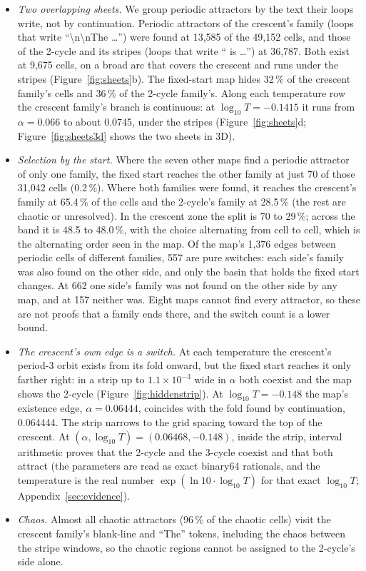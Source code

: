 \documentclass[11pt,letterpaper]{article}
\begin{document}
\begin{itemize}
  \item \emph{Two overlapping sheets.} We group periodic attractors by the text their loops write, not by
  continuation. Periodic attractors of the crescent's family (loops that write
  ``\textbackslash n\textbackslash nThe \ldots'') were found at 13{,}585 of the 49{,}152 cells, and those of the
  2-cycle and its stripes (loops that write `` is \ldots'') at 36{,}787. Both exist at 9{,}675 cells, on a broad arc that
  covers the crescent and runs under the stripes (Figure~\ref{fig:sheets}b). The fixed-start map hides 32\,\% of the
  crescent family's cells and 36\,\% of the 2-cycle family's. Along each temperature row the crescent family's
  branch is continuous: at $\log_{10}T=-0.1415$ it runs from $\alpha=0.066$ to about 0.0745, under the stripes
  (Figure~\ref{fig:sheets}d; Figure~\ref{fig:sheets3d} shows the two sheets in 3D).
  \item \emph{Selection by the start.} Where the seven other maps find a periodic attractor of only one family, the
  fixed start reaches the other family at just 70 of those 31{,}042 cells (0.2\,\%). Where both families were found,
  it reaches the crescent's family at 65.4\,\% of the cells and the 2-cycle's family at 28.5\,\% (the rest are
  chaotic or unresolved). In the crescent
  zone the split is 70 to 29\,\%; across the band it is 48.5 to 48.0\,\%, with the choice alternating from cell to
  cell, which is the alternating order seen in the map. Of the map's 1{,}376 edges between periodic cells of different
  families, 557 are pure switches: each side's family was also found on the other side, and only the basin that holds
  the fixed start changes. At 662 one side's family was not found on the other side by any map, and at 157 neither
  was. Eight maps cannot find every attractor, so these are not proofs that a family ends there, and the switch count
  is a lower bound.
  \item \emph{The crescent's own edge is a switch.} At each temperature the crescent's period-3 orbit exists from its
  fold onward, but the fixed start reaches it only farther right: in a strip up to $1.1\times10^{-3}$ wide in $\alpha$
  both coexist and the map shows the 2-cycle (Figure~\ref{fig:hiddenstrip}). At $\log_{10}T=-0.148$ the map's
  existence edge, $\alpha=0.06444$, coincides with the fold found by continuation, 0.064444. The strip narrows to the
  grid spacing toward the top of the crescent. At $(\alpha,\log_{10}T)=(0.06468,-0.148)$, inside the strip,
  interval arithmetic proves that the 2-cycle and the 3-cycle coexist and that both attract (the parameters are read
  as exact binary64 rationals, and the temperature is the real number $\exp(\ln10\cdot\log_{10}T)$ for that exact
  $\log_{10}T$; Appendix~\ref{sec:evidence}).
  \item \emph{Chaos.} Almost all chaotic attractors (96\,\% of the chaotic cells) visit the crescent family's
  blank-line and ``The'' tokens, including the chaos between the stripe windows, so the chaotic regions cannot be
  assigned to the 2-cycle's side alone.
\end{itemize}
\end{document}
